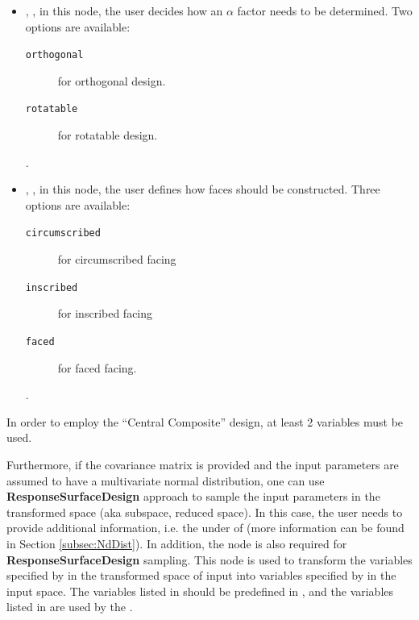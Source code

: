 \begin{itemize}
\begin{itemize}
\begin{itemize}
\begin{itemize}
        factorial block; the second one is the one for the star block.
        .
      \item {}, , in this node,
        the user decides how an $\alpha$ factor needs to be determined.
        Two options are available:
        \begin{description}
          \item[\texttt{orthogonal}] for orthogonal design.
          \item[\texttt{rotatable}] for rotatable design.
        \end{description}
        .
      \item {}, , in this node,
        the user defines how faces should be constructed.
        Three options are available:
        \begin{description}
          \item[\texttt{circumscribed}] for circumscribed facing
          \item[\texttt{inscribed}] for inscribed facing
          \item[\texttt{faced}] for faced facing.
        \end{description}
        .
     \end{itemize}
  \end{itemize}
  \nb In order to employ the ``Central Composite'' design, at least 2
  variables must be used.
\end{itemize}
\end{itemize}

Furthermore, if the covariance matrix is provided and the input parameters are assumed to have a multivariate normal distribution, one can use
\textbf{ResponseSurfaceDesign} approach to sample the input parameters in the transformed space (aka subspace, reduced space).
In this case, the user needs to provide additional information, i.e. the  under  of 
(more information can be found in Section \ref{subsec:NdDist}). In addition, the node  is also
required for \textbf{ResponseSurfaceDesign} sampling. This node is used to transform the variables specified by  in the
transformed space of input into variables specified by  in the input space. The variables listed
in  should be predefined in , and the variables listed in 
are used by the .

